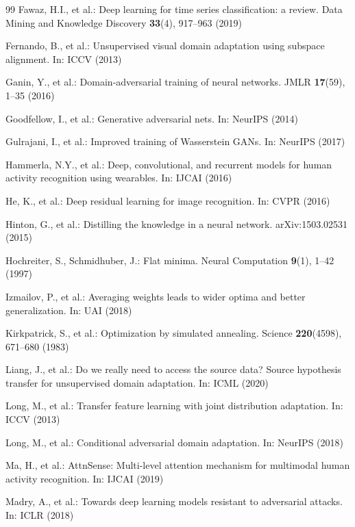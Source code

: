 \documentclass[conference]{IEEEtran}
\begin{document}
\begin{thebibliography}{99}
Fawaz, H.I., et al.: Deep learning for time series classification: a review. Data Mining and Knowledge Discovery \textbf{33}(4), 917--963 (2019)

Fernando, B., et al.: Unsupervised visual domain adaptation using subspace alignment. In: ICCV (2013)

Ganin, Y., et al.: Domain-adversarial training of neural networks. JMLR \textbf{17}(59), 1--35 (2016)

Goodfellow, I., et al.: Generative adversarial nets. In: NeurIPS (2014)

Gulrajani, I., et al.: Improved training of Wasserstein GANs. In: NeurIPS (2017)

Hammerla, N.Y., et al.: Deep, convolutional, and recurrent models for human activity recognition using wearables. In: IJCAI (2016)

He, K., et al.: Deep residual learning for image recognition. In: CVPR (2016)

Hinton, G., et al.: Distilling the knowledge in a neural network. arXiv:1503.02531 (2015)

Hochreiter, S., Schmidhuber, J.: Flat minima. Neural Computation \textbf{9}(1), 1--42 (1997)

Izmailov, P., et al.: Averaging weights leads to wider optima and better generalization. In: UAI (2018)

Kirkpatrick, S., et al.: Optimization by simulated annealing. Science \textbf{220}(4598), 671--680 (1983)

Liang, J., et al.: Do we really need to access the source data? Source hypothesis transfer for unsupervised domain adaptation. In: ICML (2020)

Long, M., et al.: Transfer feature learning with joint distribution adaptation. In: ICCV (2013)

Long, M., et al.: Conditional adversarial domain adaptation. In: NeurIPS (2018)

Ma, H., et al.: AttnSense: Multi-level attention mechanism for multimodal human activity recognition. In: IJCAI (2019)

Madry, A., et al.: Towards deep learning models resistant to adversarial attacks. In: ICLR (2018)


\end{thebibliography}
\end{document}
